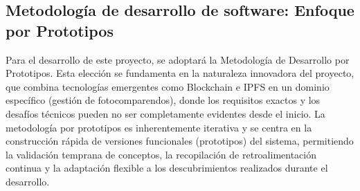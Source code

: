    \subsection{Metodología de desarrollo de software: Enfoque por Prototipos }
Para el desarrollo de este proyecto, se adoptará la Metodología de Desarrollo por Prototipos. Esta elección se fundamenta en la naturaleza innovadora del proyecto, que combina tecnologías emergentes como Blockchain e IPFS en un dominio específico (gestión de fotocomparendos), donde los requisitos exactos y los desafíos técnicos pueden no ser completamente evidentes desde el inicio. La metodología por prototipos es inherentemente iterativa y se centra en la construcción rápida de versiones funcionales (prototipos) del sistema, permitiendo la validación temprana de conceptos, la recopilación de retroalimentación continua y la adaptación flexible a los descubrimientos realizados durante el desarrollo. 